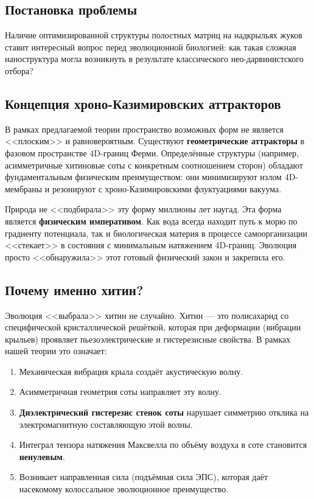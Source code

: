 \documentclass[12pt,a4paper]{article}
\begin{document}
\subsection{Постановка проблемы}

Наличие оптимизированной структуры полостных матриц на надкрыльях жуков ставит интересный вопрос перед эволюционной биологией: как такая сложная наноструктура могла возникнуть в результате классического нео-дарвинистского отбора?

\subsection{Концепция хроно-Казимировских аттракторов}

В рамках предлагаемой теории пространство возможных форм не является <<плоским>> и равновероятным. Существуют \textbf{геометрические аттракторы} в фазовом пространстве 4D-границ Ферми. Определённые структуры (например, асимметричные хитиновые соты с конкретным соотношением сторон) обладают фундаментальным физическим преимуществом: они минимизируют излом 4D-мембраны и резонируют с хроно-Казимировскими флуктуациями вакуума.

Природа не <<подбирала>> эту форму миллионы лет наугад. Эта форма является \textbf{физическим императивом}. Как вода всегда находит путь к морю по градиенту потенциала, так и биологическая материя в процессе самоорганизации <<стекает>> в состояния с минимальным натяжением 4D-границ. Эволюция просто <<обнаружила>> этот готовый физический закон и закрепила его.

\subsection{Почему именно хитин?}

Эволюция <<выбрала>> хитин не случайно. Хитин --- это полисахарид со специфической кристаллической решёткой, которая при деформации (вибрации крыльев) проявляет пьезоэлектрические и гистерезисные свойства. В рамках нашей теории это означает:
\begin{enumerate}
    \item Механическая вибрация крыла создаёт акустическую волну.
    \item Асимметричная геометрия соты направляет эту волну.
    \item \textbf{Диэлектрический гистерезис стенок соты} нарушает симметрию отклика на электромагнитную составляющую этой волны.
    \item Интеграл тензора натяжения Максвелла по объёму воздуха в соте становится \textbf{ненулевым}.
    \item Возникает направленная сила (подъёмная сила ЭПС), которая даёт насекомому колоссальное эволюционное преимущество.
\end{enumerate}
\end{document}
